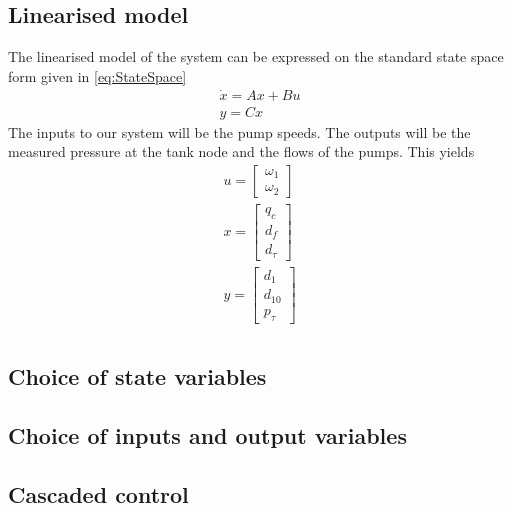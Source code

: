 \subsection{Linearised model}
The linearised model of the system can be expressed on the standard state space form given in \cref{eq:StateSpace}
\begin{equation}\label{eq:StateSpace}
	\begin{split}
	\dot{x} = Ax + Bu \\
	y = Cx
	\end{split}
\end{equation}
The inputs to our system will be the pump speeds. 
The outputs will be the measured pressure at the tank node and the flows of the pumps. This yields
\begin{equation}\label{eq:StateSpaceInputsOutputs}
	\begin{split}
		u = \begin{bmatrix} \omega_1 \\ \omega_2	\end{bmatrix} \\
		x = \begin{bmatrix} q_c \\ d_f \\ d_{\tau}	\end{bmatrix} \\
		y = \begin{bmatrix} d_1 \\ d_{10} \\ p_{\tau}	\end{bmatrix} \\
	\end{split}
\end{equation}





\subsection{Choice of state variables}

\subsection{Choice of inputs and output variables}

\subsection{Cascaded control}

